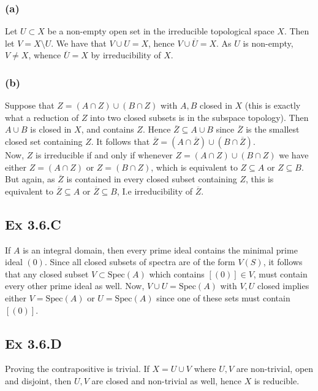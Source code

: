 \documentclass{article}
\theoremstyle{definition}
\newcommand{\Spec}{\text{Spec}}
\begin{document}
\subsubsection*{(a)}

Let $U \subset X$ be a non-empty open set in the irreducible topological space
$X$. Then let $V = X \setminus U$. We have that $V \cup U = X$, hence $V \cup
\overline{U} = X$. As $U$ is non-empty, $V \not = X$, whence $\overline{U} = X$
by irreducibility of $X$.

\subsubsection*{(b)}

Suppose that $Z = (A \cap Z) \cup (B \cap Z)$ with $A, B$ closed in $X$ (this
is exactly what a reduction of $Z$ into two closed subsets is in the subspace
topology). Then $A \cup B$ is closed in $X$, and contains $Z$. Hence
$\overline{Z} \subseteq A \cup B$ since $\overline{Z}$ is the smallest closed
set containing $Z$. It follows that $\overline{Z} = (A \cap \overline{Z}) \cup
(B \cap \overline{Z})$. \\

Now, $Z$ is irreducible if and only if whenever $Z = (A \cap Z) \cup (B \cap Z)$ 
we have either $Z = (A \cap Z)$ or $Z = (B \cap Z)$, which is equivalent to 
$Z \subseteq A$ or $Z \subseteq B$. But again, as $\overline{Z}$ is contained 
in every closed subset containing $Z$, this is equivalent to $\overline{Z} \subseteq A$ 
or $\overline{Z} \subseteq B$, I.e irreducibility of $\overline{Z}$.

\subsection*{Ex 3.6.C}

If $A$ is an integral domain, then every prime ideal contains the minimal prime
ideal $(0)$. Since all closed subsets of spectra are of the form $V(S)$, it
follows that any closed subset $V \subset \Spec(A)$ which contains $[(0)] \in
V$, must contain every other prime ideal as well. Now, $V \cup U = \Spec(A)$
with $V, U$ closed implies either $V = \Spec(A)$ or $U = \Spec(A)$ since one of
these sets must contain $[(0)]$.

\subsection*{Ex 3.6.D}

Proving the contrapositive is trivial. If $X = U \cup V$ where $U, V$ are
non-trivial, open and disjoint, then $U, V$ are closed and non-trivial as well,
hence $X$ is reducible.
\end{document}
